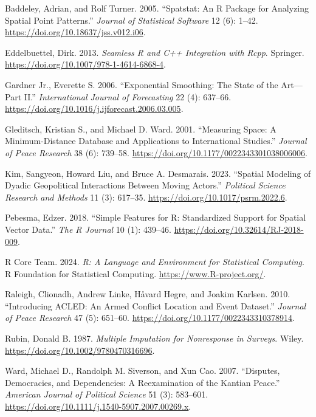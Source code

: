 \documentclass[10pt,a4paper,onecolumn]{article}
\newlength{\cslhangindent}
\newenvironment{CSLReferences}[2] %
 {\begin{list}{}{%
  \setlength{\itemindent}{0pt}
  \setlength{\leftmargin}{0pt}
  \setlength{\parsep}{0pt}
  \ifodd #1
   \setlength{\leftmargin}{\cslhangindent}
   \setlength{\itemindent}{-1\cslhangindent}
  \fi
  \setlength{\itemsep}{#2\baselineskip}}}
 {\end{list}}
\begin{document}
\protect{}\label{refs}
\begin{CSLReferences}{1}{1}
Baddeley, Adrian, and Rolf Turner. 2005. {``Spatstat: An {R} Package for
Analyzing Spatial Point Patterns.''} \emph{Journal of Statistical
Software} 12 (6): 1--42. \url{https://doi.org/10.18637/jss.v012.i06}.

Eddelbuettel, Dirk. 2013. \emph{Seamless {R} and {C++} Integration with
{Rcpp}}. Springer. \url{https://doi.org/10.1007/978-1-4614-6868-4}.

Gardner Jr., Everette S. 2006. {``Exponential Smoothing: The State of
the Art---Part {II}.''} \emph{International Journal of Forecasting} 22
(4): 637--66. \url{https://doi.org/10.1016/j.ijforecast.2006.03.005}.

Gleditsch, Kristian S., and Michael D. Ward. 2001. {``Measuring Space: A
Minimum-Distance Database and Applications to International Studies.''}
\emph{Journal of Peace Research} 38 (6): 739--58.
\url{https://doi.org/10.1177/0022343301038006006}.

Kim, Sangyeon, Howard Liu, and Bruce A. Desmarais. 2023. {``Spatial
Modeling of Dyadic Geopolitical Interactions Between Moving Actors.''}
\emph{Political Science Research and Methods} 11 (3): 617--35.
\url{https://doi.org/10.1017/psrm.2022.6}.

Pebesma, Edzer. 2018. {``Simple Features for {R}: Standardized Support
for Spatial Vector Data.''} \emph{The R Journal} 10 (1): 439--46.
\url{https://doi.org/10.32614/RJ-2018-009}.

R Core Team. 2024. \emph{R: A Language and Environment for Statistical
Computing}. R Foundation for Statistical Computing.
\url{https://www.R-project.org/}.

Raleigh, Clionadh, Andrew Linke, Håvard Hegre, and Joakim Karlsen. 2010.
{``Introducing {ACLED}: An Armed Conflict Location and Event Dataset.''}
\emph{Journal of Peace Research} 47 (5): 651--60.
\url{https://doi.org/10.1177/0022343310378914}.

Rubin, Donald B. 1987. \emph{Multiple Imputation for Nonresponse in
Surveys}. Wiley. \url{https://doi.org/10.1002/9780470316696}.

Ward, Michael D., Randolph M. Siverson, and Xun Cao. 2007. {``Disputes,
Democracies, and Dependencies: A Reexamination of the Kantian Peace.''}
\emph{American Journal of Political Science} 51 (3): 583--601.
\url{https://doi.org/10.1111/j.1540-5907.2007.00269.x}.

\end{CSLReferences}
\end{document}
